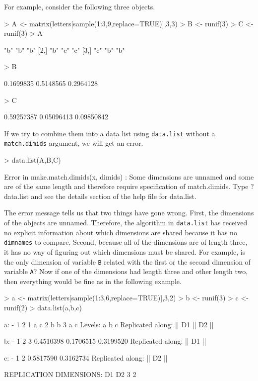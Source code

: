 \documentclass{article}
\newcommand{\code}[1]{\texttt{#1}}
\numberwithin{exercise}{section}
\begin{document}
For example, consider the following three objects.
\begin{Schunk}
\begin{Sinput}
> A <- matrix(letters[sample(1:3,9,replace=TRUE)],3,3)
> B <- runif(3)
> C <- runif(3)
> A
\end{Sinput}
\begin{Soutput}
     [,1] [,2] [,3]
[1,] "b"  "b"  "b" 
[2,] "b"  "c"  "c" 
[3,] "c"  "b"  "b" 
\end{Soutput}
\begin{Sinput}
> B
\end{Sinput}
\begin{Soutput}
[1] 0.1699835 0.5148565 0.2964128
\end{Soutput}
\begin{Sinput}
> C
\end{Sinput}
\begin{Soutput}
[1] 0.59257387 0.05096413 0.09850842
\end{Soutput}
\end{Schunk}
If we try to combine them into a data list using \code{data.list} without a \code{match.dimids} argument, we will get an error.
\begin{Schunk}
\begin{Sinput}
> data.list(A,B,C)
\end{Sinput}
\end{Schunk}
\begin{Schunk}
\begin{Soutput}
Error in make.match.dimids(x, dimids) : 
  Some dimensions are unnamed and some are 
of the same length and therefore require
specification of match.dimids. Type
?data.list and see the details section
of the help file for data.list.
\end{Soutput}
\end{Schunk}
The error message tells us that two things have gone wrong.  First, the dimensions of the objects are unnamed.  Therefore, the algorithm in \code{data.list} has received no explicit information about which dimensions are shared because it has no \code{dimnames} to compare.  Second, because all of the dimensions are of length three, it has no way of figuring out which dimensions must be shared.  For example, is the only dimension of variable \code{B} related with the first or the second dimension of variable \code{A}?  Now if one of the dimensions had length three and other length two, then everything would be fine as in the following example.
\begin{Schunk}
\begin{Sinput}
> a <- matrix(letters[sample(1:3,6,replace=TRUE)],3,2)
> b <- runif(3)
> c <- runif(2)
> data.list(a,b,c)
\end{Sinput}
\begin{Soutput}
a:
-
  1 2
1 a c
2 b b
3 a c
Levels: a b c
Replicated along:  || D1 || D2 || 


b:
-
        1         2         3 
0.4510398 0.1706515 0.3199520 
Replicated along:  || D1 || 


c:
-
        1         2 
0.5817590 0.3162734 
Replicated along:  || D2 || 


REPLICATION DIMENSIONS: 
D1 D2 
 3  2 
\end{Soutput}
\end{Schunk}
\end{document}
